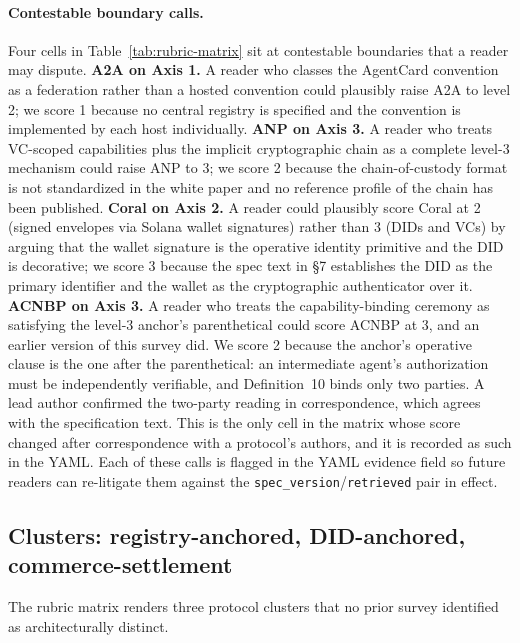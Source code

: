 \paragraph{Contestable boundary calls.}
Four cells in Table~\ref{tab:rubric-matrix} sit at
contestable boundaries that a reader may dispute. \textbf{A2A on Axis 1.} A reader
who classes the AgentCard convention as a federation
rather than a hosted convention could plausibly raise
A2A to level 2; we score 1 because no central registry
is specified and the convention is implemented by each
host individually. \textbf{ANP on Axis 3.} A reader who
treats VC-scoped capabilities plus the implicit
cryptographic chain as a complete level-3 mechanism
could raise ANP to 3; we score 2 because the
chain-of-custody format is not standardized in the
white paper and no reference profile of the chain has
been published. \textbf{Coral on Axis 2.} A reader could
plausibly score Coral at 2 (signed envelopes via Solana
wallet signatures) rather than 3 (DIDs and VCs) by
arguing that the wallet signature is the operative
identity primitive and the DID is decorative; we score 3
because the spec text in \S7 establishes the DID as the
primary identifier and the wallet as the cryptographic
authenticator over it. \textbf{ACNBP on Axis 3.} A reader
who treats the capability-binding ceremony as satisfying
the level-3 anchor's parenthetical could score ACNBP at 3,
and an earlier version of this survey did. We score 2
because the anchor's operative clause is the one after the
parenthetical: an intermediate agent's authorization must
be independently verifiable, and Definition~10 binds only
two parties. A lead author confirmed the two-party reading
in correspondence, which agrees with the specification
text. This is the only cell in the matrix whose score
changed after correspondence with a protocol's authors,
and it is recorded as such in the YAML. Each of these
calls is flagged in the YAML evidence field so future
readers can re-litigate them against the
\texttt{spec\_version}/\texttt{retrieved} pair in effect.



\subsection{Clusters: registry-anchored, DID-anchored, commerce-settlement}
\label{sec:comparison:clusters}

The rubric matrix renders three protocol clusters that no
prior survey identified as architecturally distinct.

